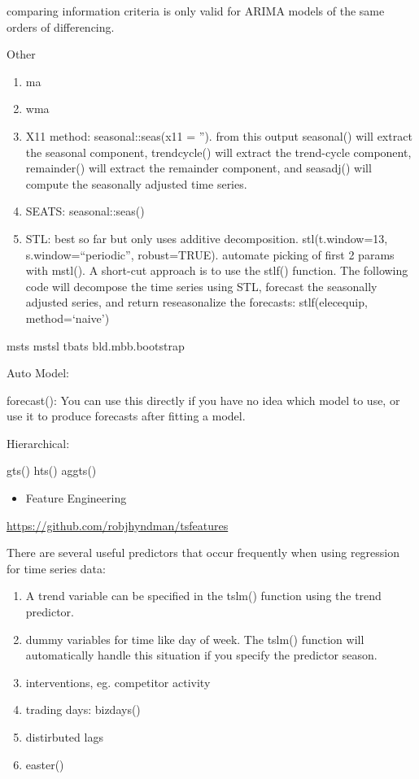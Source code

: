 \documentclass[]{book}
\providecommand{\tightlist}{%
  \setlength{\itemsep}{0pt}\setlength{\parskip}{0pt}}
\begin{document}
comparing information criteria is only valid for ARIMA models of the
same orders of differencing.

Other

\begin{enumerate}
\def\labelenumi{\arabic{enumi}.}
\item
  ma
\item
  wma
\item
  X11 method: seasonal::seas(x11 = ''). from this output seasonal() will
  extract the seasonal component, trendcycle() will extract the
  trend-cycle component, remainder() will extract the remainder
  component, and seasadj() will compute the seasonally adjusted time
  series.
\item
  SEATS: seasonal::seas()
\item
  STL: best so far but only uses additive decomposition.
  stl(t.window=13, s.window=``periodic'', robust=TRUE). automate picking
  of first 2 params with mstl(). A short-cut approach is to use the
  stlf() function. The following code will decompose the time series
  using STL, forecast the seasonally adjusted series, and return
  reseasonalize the forecasts: stlf(elecequip, method=`naive')
\end{enumerate}

msts \textbar{} mstsl \textbar{} tbats \textbar{} bld.mbb.bootstrap

Auto Model:

forecast(): You can use this directly if you have no idea which model to
use, or use it to produce forecasts after fitting a model.

Hierarchical:

gts() \textbar{} hts() \textbar{} aggts()

\begin{itemize}
\tightlist
\item
  Feature Engineering
\end{itemize}

\url{https://github.com/robjhyndman/tsfeatures}

There are several useful predictors that occur frequently when using
regression for time series data:

\begin{enumerate}
\def\labelenumi{\arabic{enumi})}
\item
  A trend variable can be specified in the tslm() function using the
  trend predictor.
\item
  dummy variables for time like day of week. The tslm() function will
  automatically handle this situation if you specify the predictor
  season.
\item
  interventions, eg. competitor activity
\item
  trading days: bizdays()
\item
  distirbuted lags
\item
  easter()
\end{enumerate}
\end{document}
